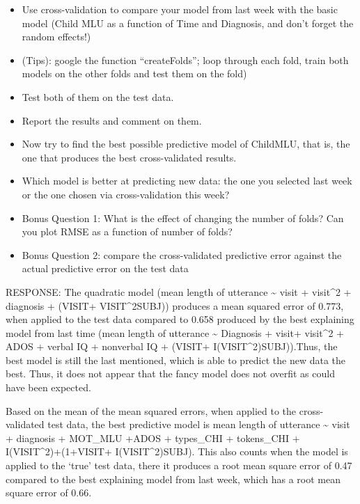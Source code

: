 \documentclass[]{article}
\begin{document}
\begin{itemize}
\item
  Use cross-validation to compare your model from last week with the
  basic model (Child MLU as a function of Time and Diagnosis, and don't
  forget the random effects!)
\item
  (Tips): google the function ``createFolds''; loop through each fold,
  train both models on the other folds and test them on the fold)
\item
  Test both of them on the test data.
\item
  Report the results and comment on them.
\item
  Now try to find the best possible predictive model of ChildMLU, that
  is, the one that produces the best cross-validated results.
\item
  Which model is better at predicting new data: the one you selected
  last week or the one chosen via cross-validation this week?
\item
  Bonus Question 1: What is the effect of changing the number of folds?
  Can you plot RMSE as a function of number of folds?
\item
  Bonus Question 2: compare the cross-validated predictive error against
  the actual predictive error on the test data
\end{itemize}

RESPONSE: The quadratic model (mean length of utterance
\textasciitilde{} visit + visit\^{}2 + diagnosis + (VISIT+
VISIT\^{}2\textbar{}SUBJ)) produces a mean squared error of 0.773, when
applied to the test data compared to 0.658 produced by the best
explaining model from last time (mean length of utterance
\textasciitilde{} Diagnosis + visit+ visit\^{}2 + ADOS + verbal IQ +
nonverbal IQ + (VISIT+ I(VISIT\^{}2)\textbar{}SUBJ)).Thus, the best
model is still the last mentioned, which is able to predict the new data
the best. Thus, it does not appear that the fancy model does not overfit
as could have been expected.

Based on the mean of the mean squared errors, when applied to the
cross-validated test data, the best predictive model is mean length of
utterance \textasciitilde{} visit + diagnosis + MOT\_MLU +ADOS +
types\_CHI + tokens\_CHI + I(VISIT\^{}2)+(1+VISIT+
I(VISIT\^{}2)\textbar{}SUBJ). This also counts when the model is applied
to the `true' test data, there it produces a root mean square error of
0.47 compared to the best explaining model from last week, which has a
root mean square error of 0.66.
\end{document}
